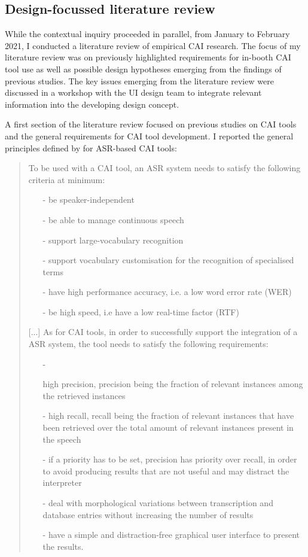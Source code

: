 \subsection{Design-focussed literature review}


While the contextual inquiry proceeded in parallel, from January to February 2021, I conducted a literature review of empirical CAI research. The focus of my literature review was on previously highlighted requirements for in-booth CAI tool use as well as possible design hypotheses emerging from the findings of previous studies. The key issues emerging from the literature review were discussed in a workshop with the UI design team to integrate relevant information into the developing design concept.

A first section of the literature review focused on previous studies on CAI tools and the general requirements for CAI tool development. I reported the general principles defined by \citet{fantinuoli2017speech} for ASR-based CAI tools:
\begin{quote}
    To be used with a CAI tool, an ASR system needs to satisfy the following criteria at minimum:
    \begin{itemize}
        \item[-] be speaker-independent
        \item[-] be able to manage continuous speech
        \item[-] support large-vocabulary recognition
        \item[-] support vocabulary customisation for the recognition of specialised terms
        \item[-] have high performance accuracy, i.e. a low word error rate (WER)
        \item[-] be high speed, i.e have a low real-time factor (RTF)
    \end{itemize}
    [...]
    As for CAI tools, in order to successfully support the integration of a ASR system, the tool needs to satisfy the following requirements:
    \begin{itemize}
        \item[-] \begin{sloppypar}high precision, precision being the fraction of relevant instances among the retrieved instances\end{sloppypar}
        \item[-] high recall, recall being the fraction of relevant instances that have been retrieved over the total amount of relevant instances present in the speech
        \item[-] if a priority has to be set, precision has priority over recall, in order to avoid producing results that are not useful and may distract the interpreter
        \item[-] deal with morphological variations between transcription and database entries without increasing the number of results
        \item[-] have a simple and distraction-free graphical user interface to present the results.
    \end{itemize}
    \citep{fantinuoli2017speech}
\end{quote}
